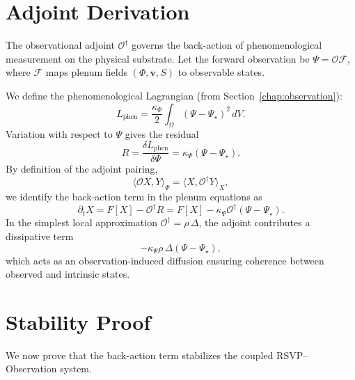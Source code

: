 \documentclass[12pt]{book}
\theoremstyle{definition}
\begin{document}
\section{Adjoint Derivation}
The observational adjoint $\mathcal{O}^\dagger$ governs the back-action of phenomenological measurement on the physical substrate.  
Let the forward observation be $\Psi = \mathcal{O}\mathcal{F}$, where $\mathcal{F}$ maps plenum fields $(\Phi, \mathbf{v}, S)$ to observable states.

We define the phenomenological Lagrangian (from Section~\ref{chap:observation}):
\begin{equation}
L_{\text{phen}} = \frac{\kappa_\Psi}{2} \int_\Omega (\Psi - \Psi_\star)^2 \, dV.
\end{equation}
Variation with respect to $\Psi$ gives the residual
\begin{equation}
R = \frac{\delta L_{\text{phen}}}{\delta \Psi} = \kappa_\Psi (\Psi - \Psi_\star).
\end{equation}
By definition of the adjoint pairing,
\begin{equation}
\langle \mathcal{O}X, Y\rangle_\Psi = \langle X, \mathcal{O}^\dagger Y \rangle_X,
\end{equation}
we identify the back-action term in the plenum equations as
\begin{equation}
\partial_t X = F[X] - \mathcal{O}^\dagger R = F[X] - \kappa_\Psi \mathcal{O}^\dagger (\Psi - \Psi_\star).
\end{equation}
In the simplest local approximation $\mathcal{O}^\dagger = \rho\,\Delta$, the adjoint contributes a dissipative term
\begin{equation}
-\kappa_\Psi \rho\, \Delta (\Psi - \Psi_\star),
\end{equation}
which acts as an observation-induced diffusion ensuring coherence between observed and intrinsic states.


\section{Stability Proof}
We now prove that the back-action term stabilizes the coupled RSVP–Observation system.
\end{document}
